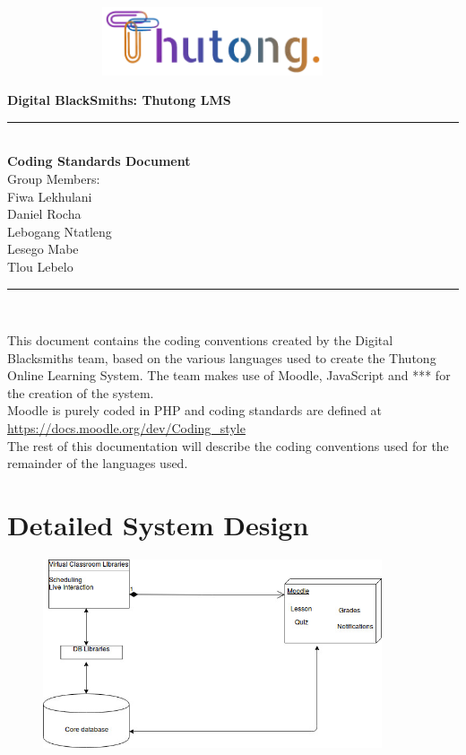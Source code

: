 \documentclass[12pt,a4paper]{article}
\begin{document}
	\begin{titlepage}
		\begin{figure}[t]
			\includegraphics[scale=0.5, height=2cm, width=10cm]{ThutongLogo.png}
		\end{figure}
		\centering
		
		\textbf{\LARGE Digital BlackSmiths: Thutong LMS}
		\newline
		\rule{\textwidth}{1.6pt}\\[\baselineskip]
		\textbf{\Large Coding Standards Document}\\
		\vspace*{0.5cm}
		\large{Group Members:}\vspace*{0.3cm}
		\\{Fiwa Lekhulani\\Daniel Rocha\\Lebogang Ntatleng\\Lesego Mabe\\Tlou Lebelo}
		\rule{\textwidth}{1.6pt}\\[\baselineskip]
		
		
		\vspace*{\fill}
	\end{titlepage}


	\date{\textbf{\today}}
	\pagebreak
	\tableofcontents
	\newpage


	This document contains the coding conventions created by the Digital Blacksmiths team, based on the various languages used to create the Thutong Online Learning System.
	\newline
	The team makes use of Moodle, JavaScript and *** for the creation of the system.\\
	Moodle is purely coded in PHP and coding standards are defined at \url{https://docs.moodle.org/dev/Coding_style} \\
	The rest of this documentation will describe the coding conventions used for the remainder of the languages used.	
	
	\section*{Detailed System Design}
	\begin{figure}[h]
			\includegraphics[width=10cm]{System.jpg}
		\end{figure}
	
\end{document}
